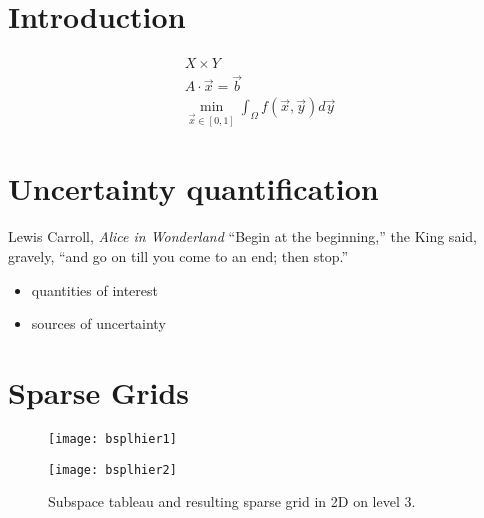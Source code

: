 
\chapter{Introduction}
\label{cha:introduction}

\begin{gather}
  X \times Y\\
  A \cdot \vec{x} = \vec{b}\\
  \min_{\vec{x} \in [0, 1]} \int_\Omega f(\vec{x}, \vec{y}) d\vec{y}
\end{gather}


\chapter{Uncertainty quantification}
\label{sec:uncert-quant}

\begin{chapquote}{Lewis Carroll, \textit{Alice in Wonderland}}
  ``Begin at the beginning,'' the King said, gravely, ``and go on till you
  come to an end; then stop.''
\end{chapquote}

\begin{itemize}
\item quantities of interest
\item sources of uncertainty
\end{itemize}

\blindtext
\blindtext
\blindtext
\blindtext
\blindtext
\blindtext
\blindtext
\blindtext
\blindtext
\blindtext
\blindtext
\blindtext
\blindtext
\blindtext
\blindtext
\blindtext

\chapter{Sparse Grids}
\label{cha:sparse-grids}

\begin{figure}
\centering
\begin{minipage}{0.48\textwidth}
\texttt{[image: bsplhier1]}
\end{minipage}
\begin{minipage}{0.48\textwidth}
\texttt{[image: bsplhier2]}
\end{minipage}
\caption{Subspace tableau and resulting sparse grid in 2D on level 3.}
\end{figure}


